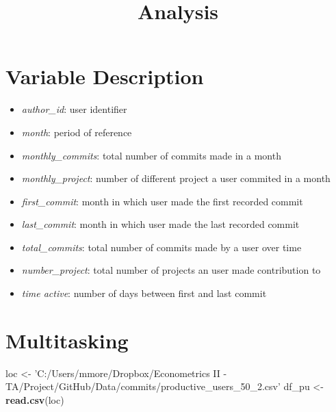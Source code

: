 \documentclass[
]{article}
\title{Analysis}
\author{}
\date{\vspace{-2.5em}}
\newenvironment{Shaded}{\begin{snugshade}}{\end{snugshade}}
\newcommand{\DataTypeTok}[1]{\textcolor[rgb]{0.13,0.29,0.53}{#1}}
\newcommand{\DecValTok}[1]{\textcolor[rgb]{0.00,0.00,0.81}{#1}}
\newcommand{\KeywordTok}[1]{\textcolor[rgb]{0.13,0.29,0.53}{\textbf{#1}}}
\newcommand{\NormalTok}[1]{#1}
\newcommand{\OperatorTok}[1]{\textcolor[rgb]{0.81,0.36,0.00}{\textbf{#1}}}
\newcommand{\StringTok}[1]{\textcolor[rgb]{0.31,0.60,0.02}{#1}}
\providecommand{\tightlist}{%
  \setlength{\itemsep}{0pt}\setlength{\parskip}{0pt}}
\begin{document}
\maketitle

\hypertarget{variable-description}{%
\section{Variable Description}\label{variable-description}}

\begin{itemize}
\tightlist
\item
  \emph{author\_id}: user identifier
\item
  \emph{month}: period of reference
\item
  \emph{monthly\_commits}: total number of commits made in a month
\item
  \emph{monthly\_project}: number of different project a user commited
  in a month
\item
  \emph{first\_commit}: month in which user made the first recorded
  commit
\item
  \emph{last\_commit}: month in which user made the last recorded commit
\item
  \emph{total\_commits}: total number of commits made by a user over
  time
\item
  \emph{number\_project}: total number of projects an user made
  contribution to
\item
  \emph{time active}: number of days between first and last commit
\end{itemize}

\hypertarget{multitasking}{%
\section{Multitasking}\label{multitasking}}

\begin{Shaded}
\begin{Highlighting}[]
\NormalTok{loc <-}\StringTok{ 'C:/Users/mmore/Dropbox/Econometrics II - TA/Project/GitHub/Data/commits/productive_users_50_2.csv'}
\NormalTok{df_pu <-}\StringTok{ }\KeywordTok{read.csv}\NormalTok{(loc)}
\end{Highlighting}
\end{Shaded}

\begin{Shaded}
\end{Shaded}
\end{document}
